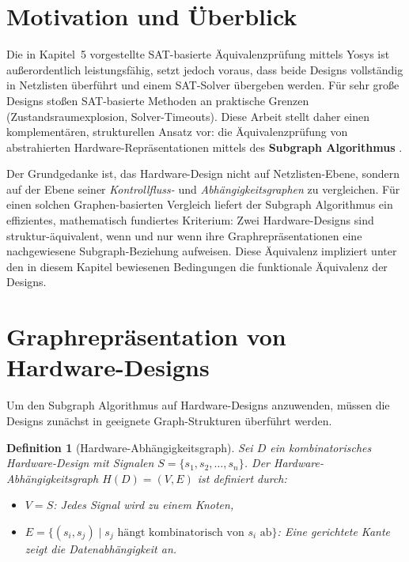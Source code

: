 ﻿\documentclass[12pt,a4paper]{report}
\newtheorem{definition}{Definition}[section]
\begin{document}
\section{Motivation und Überblick}

Die in Kapitel~5 vorgestellte SAT-basierte Äquivalenzprüfung mittels Yosys ist außerordentlich leistungsfähig, setzt jedoch voraus, dass beide Designs vollständig in Netzlisten überführt und einem SAT-Solver übergeben werden. Für sehr große Designs stoßen SAT-basierte Methoden an praktische Grenzen (Zustandsraumexplosion, Solver-Timeouts). Diese Arbeit stellt daher einen komplementären, strukturellen Ansatz vor: die Äquivalenzprüfung von abstrahierten Hardware-Repräsentationen mittels des \textbf{Subgraph Algorithmus} \cite{subgraph2026}.

Der Grundgedanke ist, das Hardware-Design nicht auf Netzlisten-Ebene, sondern auf der Ebene seiner \emph{Kontrollfluss-} und \emph{Abhängigkeitsgraphen} zu vergleichen. Für einen solchen Graphen-basierten Vergleich liefert der Subgraph Algorithmus ein effizientes, mathematisch fundiertes Kriterium: Zwei Hardware-Designs sind struktur-äquivalent, wenn und nur wenn ihre Graphrepräsentationen eine nachgewiesene Subgraph-Beziehung aufweisen. Diese Äquivalenz impliziert unter den in diesem Kapitel bewiesenen Bedingungen die funktionale Äquivalenz der Designs.

\section{Graphrepräsentation von Hardware-Designs}
\label{subsec:graph_repr}

Um den Subgraph Algorithmus auf Hardware-Designs anzuwenden, müssen die Designs zunächst in geeignete Graph-Strukturen überführt werden.

\begin{definition}[Hardware-Abhängigkeitsgraph]
\label{def:hdg}
Sei $D$ ein kombinatorisches Hardware-Design mit Signalen $S = \{s_1, s_2, \ldots, s_n\}$. Der \emph{Hardware-Abhängigkeitsgraph} $H(D) = (V, E)$ ist definiert durch:
\begin{itemize}
    \item $V = S$: Jedes Signal wird zu einem Knoten,
    \item $E = \{(s_i, s_j) \mid s_j \text{ hängt kombinatorisch von } s_i \text{ ab}\}$: Eine gerichtete Kante zeigt die Datenabhängigkeit an.
\end{itemize}
\end{definition}
\end{document}
